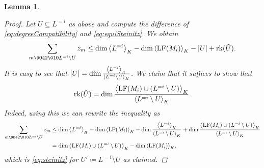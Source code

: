 \documentclass[11pt,oneside,english]{amsart}
\makeatletter
\numberwithin{equation}{section}
\numberwithin{figure}{section}
\theoremstyle{plain}
\theoremstyle{definition}
\theoremstyle{definition}
\theoremstyle{remark}
\theoremstyle{plain}
\newtheorem{lem}[thm]{Lemma}
\theoremstyle{plain}
\theoremstyle{plain}
\theoremstyle{problem@}
\makeatother
\begin{document}
\begin{lem}
\begin{proof}
Let $U\subseteq L^{=i}$ as above and compute the difference of \autoref{eq:degreeCompatibility} and \autoref{eq:equiSteinitz}.
We obtain \[
\sum_{m{\9042\010} L^{=i}\setminus U}z_{m}\leq\dim{{\left\langle {L^{=i}}\right\rangle}\sb{K}}-\dim{{\left\langle {\operatorname{LF}(M_{i})}\right\rangle}\sb{K}}-
\lvert U \rvert + {\operatorname{rk}({\tilde{U}})}.\]
It is easy to see that $\lvert U \rvert
=\dim\frac{{{\left\langle {L^{=i}}\right\rangle}\sb{K}}}{{{\left\langle {L^{=i}\setminus U}\right\rangle}\sb{K}}}$.
We claim that it suffices to show that \[
{\operatorname{rk}({\tilde{U}})}=\dim\frac{{{\left\langle {\operatorname{LF}(M_{i})\cup(L^{=i}\setminus U)}\right\rangle}\sb{K}}}{{{\left\langle {L^{=i}\setminus U}\right\rangle}\sb{K}}}.\]
Indeed, using this we can rewrite the inequality as
\begin{equation*}
  \begin{split}
    \sum_{m{\9042\010} L^{=i}\setminus U}z_{m} &\leq \dim{{\left\langle {L^{=i}}\right\rangle}\sb{K}} -
    \dim{{\left\langle {\operatorname{LF}(M_{i})}\right\rangle}\sb{K}} - \dim\frac{{{\left\langle {L^{=i}}\right\rangle}\sb{K}}}{{{\left\langle {L^{=i}\setminus U}\right\rangle}\sb{K}}}
    + \dim\frac{{{\left\langle {\operatorname{LF}(M_{i}) \cup (L^{=i}\setminus U)}\right\rangle}\sb{K}}}{{{\left\langle {L^{=i}
        \setminus U}\right\rangle}\sb{K}}}\\
    &= \dim{{\left\langle {\operatorname{LF}(M_{i})\cup(L^{=i}\setminus U)}\right\rangle}\sb{K}}-\dim{{\left\langle {\operatorname{LF}(M_{i})}\right\rangle}\sb{K}},
  \end{split}
\end{equation*}
which is \eqref{eq:steinitz} for $U'\coloneqq L^{=i}\setminus U$ as claimed.


\end{proof}
\end{lem}
\end{document}
